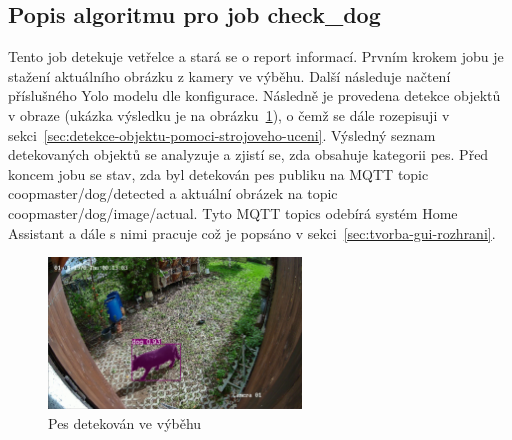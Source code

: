 \subsection*{Popis algoritmu pro job check\_dog}
Tento job detekuje vetřelce a stará se o report informací.
Prvním krokem jobu je stažení aktuálního obrázku z kamery ve výběhu.
Další následuje načtení příslušného Yolo modelu dle konfigurace.
Následně je provedena detekce objektů v obraze (ukázka výsledku je na obrázku~\ref{fig:dog_detected}), o čemž se dále rozepisuji v sekci~\ref{sec:detekce-objektu-pomoci-strojoveho-uceni}.
Výsledný seznam detekovaných objektů se analyzuje a zjistí se, zda obsahuje kategorii pes.
Před koncem jobu se stav, zda byl detekován pes publiku na MQTT topic coopmaster/dog/detected a aktuální obrázek na topic coopmaster/dog/image/actual.
Tyto MQTT topics odebírá systém Home Assistant a dále s nimi pracuje což je popsáno v sekci~\ref{sec:tvorba-gui-rozhrani}.

\begin{figure}[H]
    \centering
    \includegraphics[width=0.6\textwidth]{img/dog_detected}
    \caption{Pes detekován ve výběhu}
    \label{fig:dog_detected}
\end{figure}



